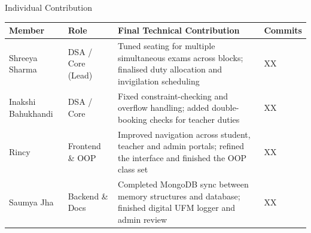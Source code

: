 \documentclass[aspectratio=169,11pt]{beamer}
\begin{document}
\begin{frame}{Individual Contribution}

\scriptsize

\begin{center}

\renewcommand{\arraystretch}{1.25}

\begin{tabularx}{.96\textwidth}
{@{}p{1.9cm}>{\RaggedRight\arraybackslash}p{2.1cm}X p{1.3cm}@{}}

\toprule
Member &
Role &
Final Technical Contribution &
Commits\\
\midrule

Shreeya Sharma &
DSA / Core (Lead) &
Tuned seating for multiple simultaneous exams across blocks; finalised duty allocation and invigilation scheduling &
XX\\

Inakshi Bahukhandi &
DSA / Core &
Fixed constraint-checking and overflow handling; added double-booking checks for teacher duties &
XX\\

Rincy &
Frontend \& OOP &
Improved navigation across student, teacher and admin portals; refined the interface and finished the OOP class set &
XX\\

Saumya Jha &
Backend \& Docs &
Completed MongoDB sync between memory structures and database; finished digital UFM logger and admin review &
XX\\

\bottomrule

\end{tabularx}

\end{center}

\end{frame}
\end{document}
